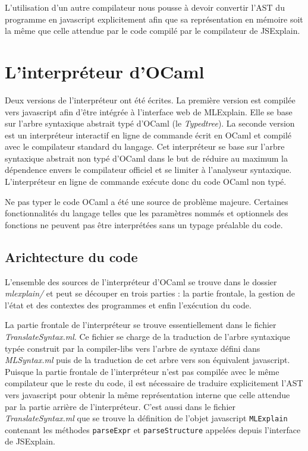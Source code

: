 \documentclass{easychair}
\begin{document}
L'utilisation d'un autre compilateur nous pousse à devoir convertir l'AST du 
programme en javascript explicitement afin que sa représentation en mémoire 
soit la même que celle attendue par le code compilé par le compilateur de 
JSExplain.

\section{L'interpréteur d'OCaml}
Deux versions de l'interpréteur ont été écrites. La première version est 
compilée vers javascript afin d'être intégrée à l'interface web de MLExplain. 
Elle se base sur l'arbre syntaxique abstrait typé d'OCaml (le \emph{Typedtree}).
La seconde version est un interpréteur interactif en ligne de commande écrit
en OCaml et compilé avec le compilateur standard du langage. Cet interpréteur 
se base sur l'arbre syntaxique abstrait non typé d'OCaml dans le but de réduire 
au maximum la dépendence envers le compilateur officiel et se limiter à 
l'analyseur syntaxique. L'interpréteur en ligne de commande exécute donc du code
OCaml non typé.

Ne pas typer le code OCaml a été une source de problème majeure. Certaines 
fonctionnalités du langage telles que les paramètres nommés et optionnels des 
fonctions ne peuvent pas être interprétées sans un typage préalable du code.

\subsection{Arichtecture du code}
L'ensemble des sources de l'interpréteur d'OCaml se trouve dans le dossier 
\emph{mlexplain/} et peut se découper en trois parties : la partie 
frontale, la gestion de l'état et des contextes des programmes et enfin 
l'exécution du code.

La partie frontale de l'interpréteur se trouve essentiellement dans le fichier 
\emph{TranslateSyntax.ml}. Ce fichier se charge de la traduction de 
l'arbre syntaxique typée construit par la compiler-libs vers l'arbre de syntaxe 
défini dans \emph{MLSyntax.ml} puis de la traduction de cet arbre vers son 
équivalent javascript. Puisque la partie frontale de l'interpréteur n'est pas 
compilée avec le même compilateur que le reste du code, il est nécessaire de 
traduire explicitement l'AST vers javascript pour obtenir la même 
représentation interne que celle attendue par la partie arrière de 
l'interpréteur. C'est aussi dans le fichier \emph{TranslateSyntax.ml} que se 
trouve la définition de l'objet javascript \verb|MLExplain| contenant les 
méthodes \verb|parseExpr| et \verb|parseStructure| appelées depuis l'interface 
de JSExplain.
\end{document}
